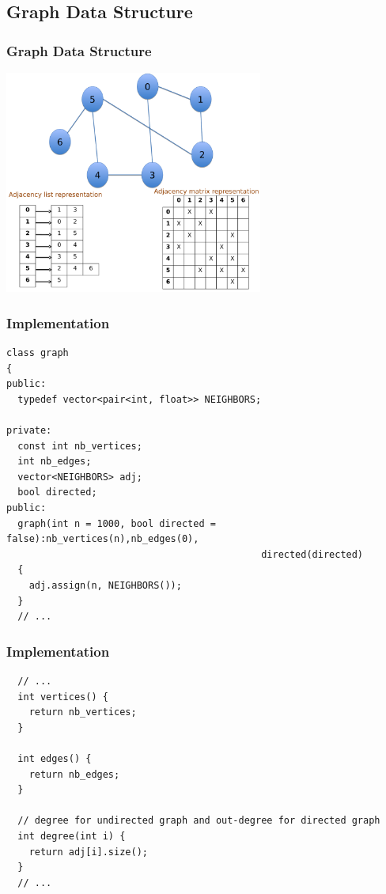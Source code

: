 \documentclass{beamer}
\begin{document}
\subsection{Graph Data Structure}

\begin{frame}%
\frametitle{Graph Data Structure}

\vspace{-0.3cm}

\begin{center}
\includegraphics[width=8.5cm]{graph_representation.pdf}
\end{center}

\end{frame}

\begin{frame}[containsverbatim]
\frametitle{Implementation}
\scriptsize
\begin{lstlisting}
class graph
{
public:
  typedef vector<pair<int, float>> NEIGHBORS;

private:
  const int nb_vertices;
  int nb_edges;
  vector<NEIGHBORS> adj;
  bool directed;
public:
  graph(int n = 1000, bool directed = false):nb_vertices(n),nb_edges(0),
                                             directed(directed)
  {
    adj.assign(n, NEIGHBORS());
  }
  // ...
\end{lstlisting}

\end{frame}

\begin{frame}[containsverbatim]
\frametitle{Implementation}
\scriptsize
\begin{lstlisting}
  // ...
  int vertices() {
    return nb_vertices;
  }

  int edges() {
    return nb_edges;
  }

  // degree for undirected graph and out-degree for directed graph
  int degree(int i) {
    return adj[i].size();
  }
  // ...
\end{lstlisting}

\end{frame}
\end{document}
